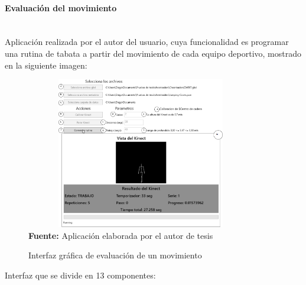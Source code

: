 \paragraph{Evaluaci\'on del movimiento}\mbox{} \\\label{ins:UI:wpf:evaluate}
Aplicaci\'on realizada por el autor del usuario, cuya funcionalidad es programar una rutina de tabata a partir del movimiento de cada equipo deportivo, mostrado en la siguiente imagen:
\begin{figure}[H]
	\caption{Interfaz gr\'afica de evaluaci\'on de un movimiento}
	\label{fig:appEvaluate}
	\centering
	\includegraphics[width=380px,height=250px]{graphics/appEvaluacion.png} \\
	\textbf{Fuente:} Aplicaci\'on elaborada por el autor de tesis
\end{figure}
Interfaz que se divide en 13 componentes:
